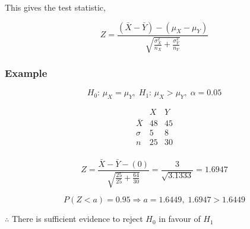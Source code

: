 \documentclass{article}
\begin{document}

\noindent This gives the test statistic,

\[Z=\frac{\left(\bar{X} - \bar{Y}\right) - \left(\mu_X - \mu_Y\right)}
{\sqrt{\frac{\sigma_X^2}{n_X} + \frac{\sigma_Y^2}{n_Y}}}\]

\subsubsection{Example}

\[H_0:\, \mu_X = \mu_Y,\; H_1:\, \mu_X > \mu_Y,\; \alpha = 0.05\]

\[\begin{array}{ccc}
    
            & X  & Y \\
    \bar{X} & 48 & 45 \\
    \sigma  & 5  & 8 \\
    n       & 25 & 30 \\

\end{array}\]

\[Z = \frac{\bar{X} - \bar{Y} - (0)}{\sqrt{\frac{25}{25} + \frac{64}{30}}} =
\frac{3}{\sqrt{3.1333}} = 1.6947\]

\[P\left(Z < a\right) = 0.95 \Rightarrow a = 1.6449,\; 1.6947 > 1.6449\]

\noindent $\therefore$ There is sufficient evidence to reject $H_0$ in favour of
$H_1$
\end{document}
